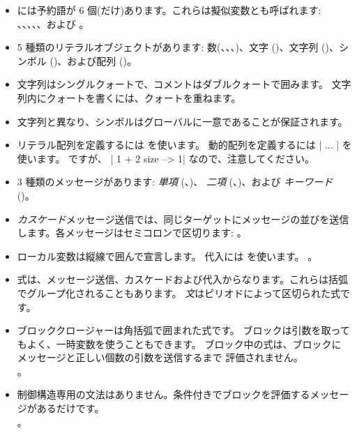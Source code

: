 \documentclass[a4paper,10pt,twoside]{book}
\begin{document}
\begin{itemize}

\item	\pharo には予約語が 6 個(だけ)あります。これらは擬似変数とも呼ばれます: 、、、、、および 。

\item	5 種類のリテラルオブジェクトがあります: 数(、、、)、文字 ()、文字列 ()、シンボル ()、および配列 ()。

\item	文字列はシングルクォートで、コメントはダブルクォートで囲みます。
		文字列内にクォートを書くには、クォートを重ねます。

\item	文字列と異なり、シンボルはグローバルに一意であることが保証されます。

\item	リテラル配列を定義するには  を使います。
		動的配列を定義するには \ct|{ ... }| を使います。
		 ですが、
		\ct|{ 1 + 2 } size --> 1|
		なので、注意してください。

\item	3 種類のメッセージがあります:
		\emph{単項} (\eg {}、)、
		\emph{二項} (\eg {}、)、および
		\emph{キーワード} (\eg {})。

\item	\emph{カスケード}メッセージ送信では、同じターゲットにメッセージの並びを送信します。各メッセージはセミコロンで区切ります:
。

\item	ローカル変数は縦線で囲んで宣言します。
		代入には \ct{:=} を使います。
		。

\item	式は、メッセージ送信、カスケードおよび代入からなります。これらは括弧でグループ化されることもあります。
		\emph{文}はピリオドによって区切られた式です。

\item	ブロッククロージャーは角括弧で囲まれた式です。
		ブロックは引数を取ってもよく、一時変数を使うこともできます。
		ブロック中の式は、ブロックに  メッセージと正しい個数の引数を送信するまで
		評価されません。\\
		。

\item	制御構造専用の文法はありません。条件付きでブロックを評価するメッセージがあるだけです。\\
 		。

\end{itemize}

\ifx\wholebook\relax\else
\end{document}
